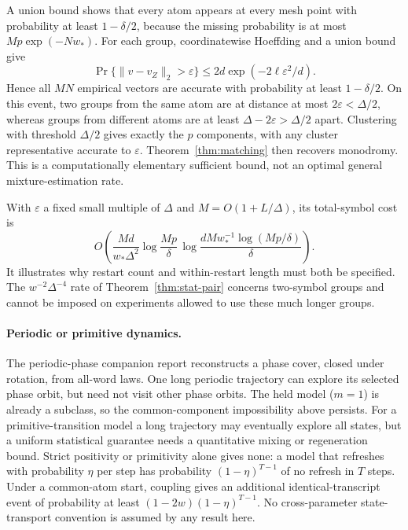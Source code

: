 \documentclass[11pt]{article}
\theoremstyle{remark}\newtheorem{remark}[theorem]{Remark}
\begin{document}
A union bound shows that every atom appears at every mesh point with probability at least $1-\delta/2$, because the missing probability is at most $Mp\exp(-Nw_*)$. For each group, coordinatewise Hoeffding and a union bound give
\[
 \Pr\{\|\widehat v-v_Z\|_2>\varepsilon\}
 \leq2d\exp(-2\ell\varepsilon^2/d).
\]
Hence all $MN$ empirical vectors are accurate with probability at least $1-\delta/2$. On this event, two groups from the same atom are at distance at most $2\varepsilon<\Delta/2$, whereas groups from different atoms are at least $\Delta-2\varepsilon>\Delta/2$ apart. Clustering with threshold $\Delta/2$ gives exactly the $p$ components, with any cluster representative accurate to $\varepsilon$. Theorem~\ref{thm:matching} then recovers monodromy. This is a computationally elementary sufficient bound, not an optimal general mixture-estimation rate.

With $\varepsilon$ a fixed small multiple of $\Delta$ and $M=O(1+L/\Delta)$, its total-symbol cost is
\[
 O\!\left(\frac{Md}{w_*\Delta^2}
 \log\frac{Mp}{\delta}\,
 \log\frac{dM w_*^{-1}\log(Mp/\delta)}{\delta}\right).
\]
It illustrates why restart count and within-restart length must both be specified. The $w^{-2}\Delta^{-4}$ rate of Theorem~\ref{thm:stat-pair} concerns two-symbol groups and cannot be imposed on experiments allowed to use these much longer groups.

\paragraph{Periodic or primitive dynamics.}
The periodic-phase companion report reconstructs a phase cover, closed under rotation, from all-word laws. One long periodic trajectory can explore its selected phase orbit, but need not visit other phase orbits. The held model ($m=1$) is already a subclass, so the common-component impossibility above persists. For a primitive-transition model a long trajectory may eventually explore all states, but a uniform statistical guarantee needs a quantitative mixing or regeneration bound. Strict positivity or primitivity alone gives none: a model that refreshes with probability $\eta$ per step has probability $(1-\eta)^{T-1}$ of no refresh in $T$ steps. Under a common-atom start, coupling gives an additional identical-transcript event of probability at least $(1-2w)(1-\eta)^{T-1}$. No cross-parameter state-transport convention is assumed by any result here.
\end{document}
